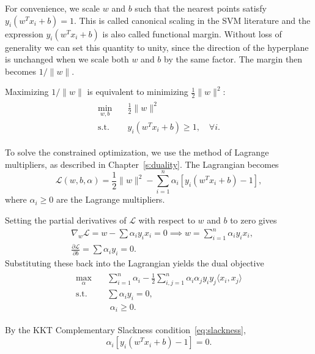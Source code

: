 For convenience, we scale $w$ and $b$ such that the nearest points satisfy $y_i(w^T x_i + b) = 1$. This is called canonical scaling in the SVM literature and the expression $y_i(w^T x_i + b)$ is also called functional margin. Without loss of generality we can set this quantity to unity, since the direction of the hyperplane is unchanged when we scale both $w$ and $b$ by the same factor. The margin then becomes $1/\|w\|$.

Maximizing $1/\|w\|$ is equivalent to minimizing $\frac{1}{2}\|w\|^2$:
\begin{align}\label{svm}
\begin{split}
\min_{w, b} & \quad \frac{1}{2}\|w\|^2 \\
\text{s.t.} & \quad y_i(w^T x_i + b) \geq 1, \quad \forall i.
\end{split}
\end{align}

To solve the constrained optimization, we use the method of Lagrange multipliers, as described in Chapter~\ref{s:duality}. The Lagrangian becomes
$$\mathcal{L}(w, b, \alpha) = \frac{1}{2}\|w\|^2 - \sum_{i=1}^n \alpha_i [y_i(w^T x_i + b) - 1],$$
where $\alpha_i \geq 0$ are the Lagrange multipliers.

Setting the partial derivatives of $\mathcal{L}$ with respect to $w$ and $b$ to zero gives
\begin{align*}
& \nabla_{w} \mathcal{L} = w - \sum \alpha_i y_i x_i = 0 \implies w = \sum_{i=1}^n \alpha_i y_i x_i, \\
& \frac{\partial \mathcal{L}}{\partial b} = \sum \alpha_i y_i = 0.
\end{align*}
Substituting these back into the Lagrangian yields the dual objective
\begin{align}\label{SVMdual}
\begin{split}
 \max_{\alpha} & \quad \sum_{i=1}^n \alpha_i - \frac{1}{2} \sum_{i,j=1}^n \alpha_i \alpha_j y_i y_j \langle x_i, x_j\rangle \\
\text{s.t.}      & \quad \sum \alpha_i y_i = 0,  \\
& \quad \,\, \alpha_i \geq 0.
\end{split}
\end{align}

By the KKT Complementary Slackness condition~\eqref{eq:slackness}, 
$$\alpha_i [y_i(w^T x_i + b) - 1] = 0.$$ 

